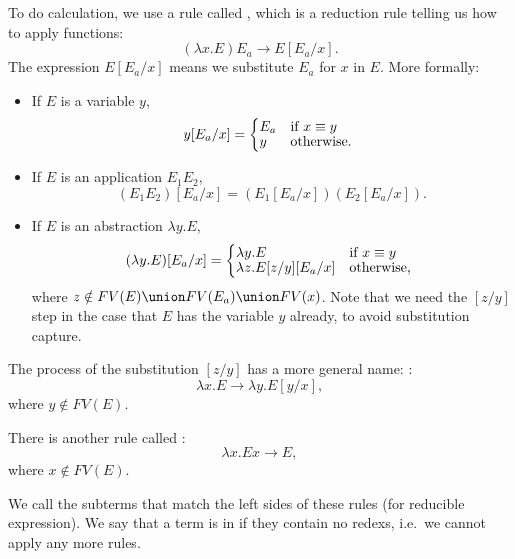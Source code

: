 \documentclass[class=scrartcl]{standalone}
\begin{document}
To do calculation, we use a rule called ,
which is a reduction rule telling us how to apply functions:
\[
  (\lambda x. E)E_a \to E[E_a / x].
\]
The expression \(E[E_a / x]\) means
we substitute \(E_a\) for \(x\) in \(E\).
More formally:
\begin{itemize}
  \item If \(E\) is a variable \(y\),
        \[
          y[E_a / x] = \begin{cases*}
              E_a & if \(x \equiv y\) \\[-1ex]
            y & otherwise.
          \end{cases*}
        \]
  \item If \(E\) is an application \(E_1 E_2\),
        \[
          (E_1 E_2)[E_a / x] = (E_1[E_a / x]) (E_2[E_a / x]).
        \]
  \item If \(E\) is an abstraction \(\lambda y. E\),
        \[
          (\lambda y. E)[E_a / x] =
          \begin{cases*}
            \lambda y. E & if \(x \equiv y\) \\[-1ex]
            \lambda z. E[z / y][E_a / x] & otherwise, %
          \end{cases*}
        \]
        where \(z \notin FV(E) \union FV(E_a) \union FV(x)\).
        Note that we need the \([z / y]\) step in the case
        that \(E\) has the variable \(y\) already,
        to avoid substitution capture.
\end{itemize}

The process of the substitution \([z / y]\) has a more general name:
:
\[
  \lambda x. E \to \lambda y.E[y / x],
\]
where \(y \notin FV(E)\).

There is another rule called :
\[
  \lambda x. E x \to E,
\]
where \(x \notin FV(E)\).

We call the subterms that match the left sides of these rules 
(for reducible expression).
We say that a term is in  if they contain no redexs,
i.e.\ we cannot apply any more rules.
\end{document}
